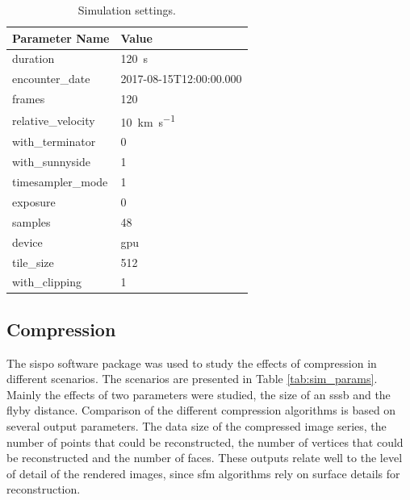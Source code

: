 \begin{table}[htb]
    \centering
    \caption{Simulation settings.}
    \label{tab:sim_settings}
    \begin{tabular}{l|l}
        \textbf{Parameter Name} & \textbf{Value} \\ \hline
        duration       & \SI{120}{\second}   \\
        encounter\_date & 2017-08-15T12:00:00.000\\
        frames       & \SI{120}{}     \\
        relative\_velocity     &  \SI{10}{\kilo\meter\per\second} \\
        with\_terminator  & \SI{0}{} \\
        with\_sunnyside & \SI{1}{} \\
        timesampler\_mode & \SI{1}{} \\
        exposure & \SI{0}{} \\
        samples & \SI{48}{} \\
        device & \gls{gpu} \\
        tile\_size & \SI{512}{} \\
        with\_clipping & \SI{1}{}
    \end{tabular}
\end{table}


\subsection{Compression} \label{sec:results_comp}
The \gls{sispo} software package was used to study the effects of compression in different scenarios. The scenarios are presented in Table \ref{tab:sim_params}. Mainly the effects of two parameters were studied, the size of an \gls{sssb} and the flyby distance. Comparison of the different compression algorithms is based on several output parameters. The data size of the compressed image series, the number of points that could be reconstructed, the number of vertices that could be reconstructed and the number of faces. These outputs relate well to the level of detail of the rendered images, since \gls{sfm} algorithms rely on surface details for reconstruction.



